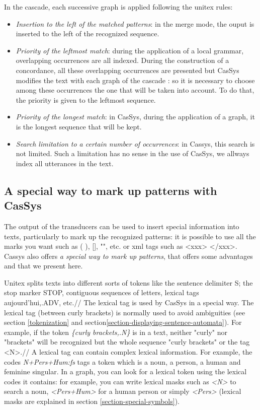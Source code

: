 In the cascade, each successive graph is applied following the unitex rules:
\begin{itemize}
	\item \textit{Insertion to the left of the matched patterns}: in the merge mode, the ouput is inserted to the left of the recognized sequence.
	\item	\textit{Priority of the leftmost match}: during the application of a local grammar, overlapping occurrences are all indexed. 
	During the construction of a concordance, all these overlapping occurrences are presented but CasSys modifies the text with each 
	graph of the cascade : so it is necessary to choose among these occurrences the one that will be taken into account. To do that, the priority is given to the leftmost sequence.
	\item \textit{Priority of the longest match}: in CasSys, during the application of a graph, it is the longest sequence 
	that will be kept.
	\item	\textit{Search limitation to a certain number of occurrences}: in Cassys, this search is not limited. Such a limitation has no sense in the use of CasSys, we allways index all utterances in the text.
\end{itemize}

\subsection{A special way to mark up patterns with CasSys}

The output of the transducers can be used to insert special information into texts, particularly to mark up the recognized patterns: it is 
possible to use all the marks you want such as ( ), [], "", etc. or xml tags such as <xxx> </xxx>.\\
Cassys also offers\textit{ a special way to mark up patterns}, that offers some advantages and that we present here.  

\bigskip
\noindent Unitex splits texts into different sorts of tokens like the sentence delimiter {S}; the stop marker {STOP}, contiguous 
sequences of letters, lexical tags {aujourd'hui,.ADV}, etc.//
The lexical tag is used by CasSys in a special way. The lexical tag (between curly brackets) is normally used to avoid ambiguities (see section \ref{tokenization} and section\ref{section-displaying-sentence-automata}). 
For example, if the token \emph{\{curly brackets,.N\}} is in a text, neither "curly" nor "brackets" will be recognized but the whole sequence 
"curly brackets" or the tag <N>.// 
A lexical tag can contain complex lexical information. For example, the codes \emph{N+Pers+Hum:fs} tags a token which is a noun, a person, a human and feminine singular. In a graph, you can look for a lexical token using the lexical codes it contains: for example, you can write lexical masks such as \emph{<N>} to search a noun, \emph{<Pers+Hum>} for a human person or simply \emph{<Pers>} (lexical masks are explained in section \ref{section-special-symbols}).
 
